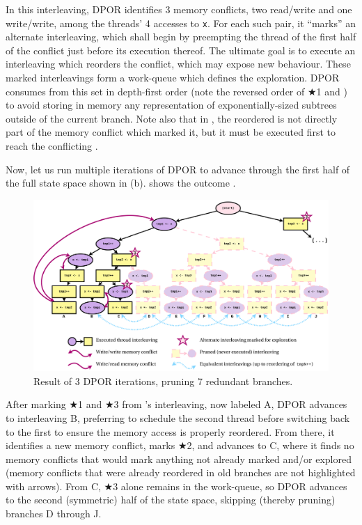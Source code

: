 In this interleaving, DPOR identifies 3 memory conflicts, two read/write and one write/write,
among the threads' 4 accesses to {\tt x}.
For each such pair, it ``marks'' an alternate interleaving,
which shall begin by preempting the thread of the first half of the conflict just before its execution thereof.
The ultimate goal is to execute an interleaving which reorders the conflict, which may expose new behaviour.
These marked interleavings form a work-queue which defines the exploration.
DPOR consumes from this set in depth-first order
(note the reversed order of $\bigstar$1 and )
to avoid storing in memory any representation of exponentially-sized subtrees outside of the current branch.
Note also that in ,
the reordered  is not directly part of the memory conflict which marked it,
but it must be executed first to reach the conflicting .

Now, let us run multiple iterations of DPOR
to advance through the first half of the full state space shown in (b).
 shows the outcome
.

\begin{figure}[h]
	\begin{center}
		\includegraphics[width=\textwidth]{dpor-example-1.pdf}
	\end{center}
	\caption{Result of 3 DPOR iterations, pruning 7 redundant branches.}
	\label{fig:dpor-example-1}
\end{figure}

After marking $\bigstar$1 and $\bigstar$3 from 's interleaving, now labeled A,
DPOR advances to interleaving B, preferring to schedule the second thread before switching back to the first
to ensure the memory access is properly reordered.
From there, it identifies a new memory conflict, marks $\bigstar$2, and advances to C,
where it finds no memory conflicts that would mark anything not already marked and/or explored
(memory conflicts that were already reordered in old branches are not highlighted with arrows).
From C, $\bigstar$3 alone remains in the work-queue,
so DPOR advances to the second (symmetric) half of the state space,
skipping (thereby pruning) branches D through J.

